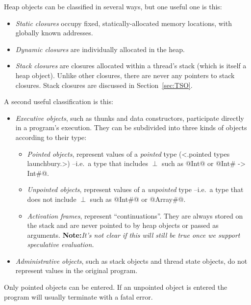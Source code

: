 \documentclass[11pt]{article}
\newcommand{\note}[1]{{{\bf Note:}\sl #1}}
\newcommand{\bottom}{\perp}
\newcommand{\secref}[1]{Section~\ref{sec:#1}}
\begin{document}
Heap objects can be classified in several ways, but one useful one is
this:
\begin{itemize}
\item 
\emph{Static closures} occupy fixed, statically-allocated memory
locations, with globally known addresses.

\item 
\emph{Dynamic closures} are individually allocated in the heap.

\item 
\emph{Stack closures} are closures allocated within a thread's stack
(which is itself a heap object).  Unlike other closures, there are
never any pointers to stack closures.  Stack closures are discussed in
\secref{TSO}.

\end{itemize}
A second useful classification is this:
\begin{itemize}

\item \emph{Executive objects}, such as thunks and data constructors,
participate directly in a program's execution.  They can be subdivided
into three kinds of objects according to their type: \begin{itemize}

\item \emph{Pointed objects}, represent values of a \emph{pointed}
type (<.pointed types launchbury.>) --i.e.~a type that includes
$\bottom$ such as @Int@ or @Int# -> Int#@.

\item \emph{Unpointed objects}, represent values of a \emph{unpointed}
type --i.e.~a type that does not include $\bottom$ such as @Int#@ or
@Array#@.

\item \emph{Activation frames}, represent ``continuations''.  They are
always stored on the stack and are never pointed to by heap objects or
passed as arguments.  \note{It's not clear if this will still be true
once we support speculative evaluation.}

\end{itemize}

\item \emph{Administrative objects}, such as stack objects and thread
state objects, do not represent values in the original program.
\end{itemize}

Only pointed objects can be entered.  If an unpointed object is
entered the program will usually terminate with a fatal error.
\end{document}
